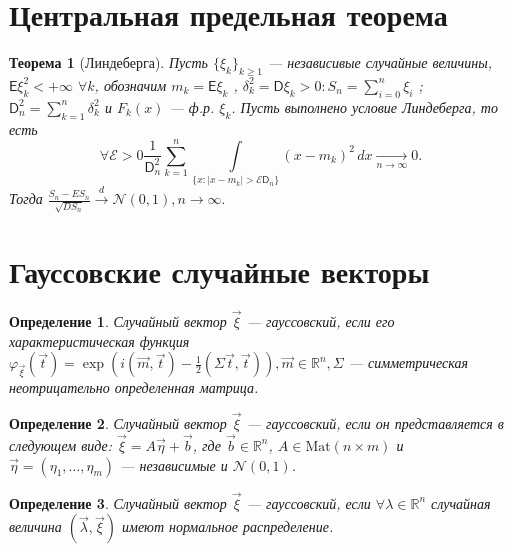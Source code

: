 \documentclass[11pt]{article}
\begin{document}
\newtheorem{definition}{Определение}
\newtheorem{thm}{Теорема}[section]
\newenvironment{problem}[1]{{\sffamily\bfseries\thesum. #1} \par}%
{\\ \stepcounter{sum}}
 
	\section{Центральная предельная теорема}
	\begin{thm}[Линдеберга]
	Пусть $\{\xi_k\}_{k\geq1}$ --- независивые случайные величины, $\mathsf{E}\xi_k^2<+\infty$ $\forall k$, обозначим $m_k = \mathsf{E}\xi_k$ , $\delta_k^2 = \mathsf{D}\xi_k > 0 : S_n = \sum\limits_{i = 0}^n \xi_i $ ; $\mathsf{D}_n^2 = \sum\limits_{k = 1}^n \delta_k^2$ и $F_k(x)$ --- ф.р. $\xi_k$. Пусть выполнено условие Линдеберга, то есть
  	$$\forall\mathcal{E}>0 \frac{1}{\mathsf{D}_n^2} \sum  \limits_{k = 1}^n \int \limits_{\{x:|x-m_k|>\mathcal{E} \mathsf{D}_n\}} (x-m_k)^2 \, dx \xrightarrow[n\rightarrow\infty]{}0.$$ 
  	Тогда $\frac{S_n-ES_n}{\sqrt{DS_n}}\xrightarrow{d} \mathcal{N}(0,1), n\rightarrow\infty.$
	\end{thm}
	\section{Гауссовские случайные векторы}
	\begin{definition}
	Случайный вектор $\vec{\xi}$ --- гауссовский, если его характеристическая функция 
	$\varphi_{\vec{\xi}} (\vec{t}) = \exp(i(\vec{m}, \vec{t}) - \frac{1}{2}(\Sigma \vec{t},\vec{t})), \vec{m}\in\mathbb{R}^n, \Sigma$ --- симметрическая неотрицательно определенная матрица.
	\end{definition}

	\begin{definition}
	Случайный вектор $\vec{\xi}$ --- гауссовский, если он представляется в следующем виде: 
	$\vec{\xi} = A\vec{\eta} + \vec{b}$, где $\vec{b} \in \mathbb{R}^n$, $A\in \text{Mat}(n\times m)$ и $\vec{\eta} = (\eta_1, \dots , \eta_m)$ --- независимые и $\mathcal{N}(0,1)$.
	\end{definition}
	
	\begin{definition}
	Случайный вектор $\vec{\xi}$ --- гауссовский, если $\forall\lambda\in\mathbb{R}^n$ случайная величина $(\vec{\lambda},\vec{\xi})$ имеют нормальное распределение.
	\end{definition}
	
\end{document}
